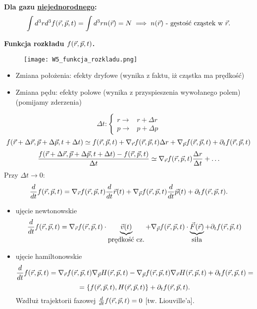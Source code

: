 \textbf{Dla gazu \underline{niejednorodnego}:}
\begin{equation}
\int d^3rd^3f(\vec{r},\vec{p},t) = \int d^3r n(\vec{r}) = N \implies n(\vec{r}) 
\mbox{ - gęstość cząstek w } \vec{r}.
\end{equation}

\textbf{Funkcja rozkładu $f(\vec{r},\vec{p},t)$.}
\begin{figure}
\centering
\texttt{[image: W5\_funkcja\_rozkladu.png]}
\end{figure}
\begin{itemize}
\item Zmiana położenia: efekty dryfowe (wynika z faktu, iż cząstka ma prędkość)
\item Zmiana pędu: efekty polowe (wynika z przyspieszenia wywołanego polem)(pomijamy zderzenia)
\end{itemize}

$$ \Delta t:
\begin{cases} r \to & r+\Delta r \\
				p \to & p+\Delta p\end{cases}$$
$$ f(\vec{r}+\Delta\vec{r},\vec{p}+\Delta\vec{p},t+\Delta t) \simeq 
f(\vec{r},\vec{p},t) +\nabla_{\vec{r}} f(\vec{r},\vec{p},t) \Delta r + \nabla_{\vec{p}} f(\vec{r},\vec{p},t) + \partial_t f(\vec{r},\vec{p},t) $$
$$\dfrac{f(\vec{r}+\Delta\vec{r},\vec{p}+\Delta\vec{p},t+\Delta t)-f(\vec{r},\vec{p},t)}{\Delta t}
\simeq \nabla_{\vec{r}} f(\vec{r},\vec{p},t) \frac{\Delta r}{\Delta t} + \ldots
$$
Przy $\Delta t \to 0$:
$$\dfrac{d}{dt} f(\vec{r},\vec{p},t) = \nabla_{\vec{r}} f(\vec{r},\vec{p},t) \dfrac{d}{dt} \vec{r}(t) + \nabla_{\vec{p}} f(\vec{r},\vec{p},t) 
\dfrac{d}{dt} \vec{p}(t) + \partial_t f(\vec{r},\vec{p},t).$$
\begin{itemize}
\item ujęcie newtonowskie
$$\dfrac{d}{dt} f (\vec{r},\vec{p},t) = \nabla_{\vec{r}}f(\vec{r},\vec{p},t)\cdot\underbrace{\vec{v}(t)}_{\mbox{prędkość
cz.}} +\nabla_{\vec{p}}f(\vec{r},\vec{p},t)\cdot\underbrace{\vec{F}(\vec{r})}_{\mbox{siła}}+\partial_t f(\vec{r},\vec{p},t)$$
\item ujęcie hamiltonowskie
$$\dfrac{d}{dt} f(\vec{r},\vec{p},t) = \nabla_{\vec{r}} f(\vec{r},\vec{p},t) \nabla_{\vec{p}} H(\vec{r},\vec{p},t) - \nabla_{\vec{p}}f(\vec{r},\vec{p},t) \nabla_{\vec{r}}H(\vec{r},\vec{p},t) +
\partial_t f(\vec{r},\vec{p},t) = $$
$$=\{ f(\vec{r},\vec{p},t),H(\vec{r},\vec{p},t) \} + \partial_t f(\vec{r},\vec{p},t).$$
Wzdłuż trajektorii fazowej $\frac{d}{dt}f(\vec{r},\vec{p},t) =0$ [tw. Liouville'a].
\end{itemize}
